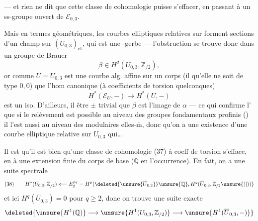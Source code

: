 --- et rien ne dit que cette classe de cohomologie puisse s'effacer, en passant à un ss-groupe ouvert de $\mathcal E_{0,3}$.


Mais en termes géométriques,  les courbes elliptiques relatives  sur  forment  sections d'un champ sur $(U_{0,3})_{\mathrm{et}}$, qui est une -gerbe --- l'obstruction se trouve donc dans un groupe de Brauer
\[
\beta\in H^2(U_{0,3},\mathbb Z_{/2}), \tag{37}
\]
or comme $U=U_{0,3}$ est une courbe alg.  affine sur un corps (il  qu'elle ne soit de type $0,0$)  que l'hom canonique (à coefficients de torsion quelconques)
\[
H^*(\mathcal E_U,-)\longrightarrow H^*(U,-)
\]
est un iso. D'ailleurs, il  être $\pm$ trivial que $\beta$ est l'image de $\alpha$ --- ce qui confirme l' que  si le relèvement est possible au niveau des groupes fondamentaux profinis () il l'est aussi au niveau des  modulaires elles-$\overline{\mathrm m}$, donc qu'on a une existence d'une courbe elliptique relative sur $U_{0,3}$ qui\ldots


Il est  qu'il est bien  qu'une classe de cohomologie (37) à coeff de torsion s'efface, en  à une extension finie du  corps de base ($\mathbb Q$ en l'occurrence). En fait, on a une suite spectrale
\[
(38)\qquad H^*(U_{0,3},\mathbb Z_{/2})
\Longleftarrow E_2^{pq}
=H^p(\deleted{\unsure{\overline U_{0,3}}}\unsure{\mathbb Q},H^q(\overline U_{0,3},\mathbb Z_{/2}\unsure{)|))}
\]
et ici $H^q(\overline U_{0,3})=0$ pour $q\geq 2$, donc on trouve une suite exacte
\[
\deleted{\unsure{H^1(\mathbb Q)}\longrightarrow
\unsure{H^1(U_{0,3},\mathbb Z_{/2})}\longrightarrow
\unsure{H^1(\overline U_{0,3},-)}}
\]

